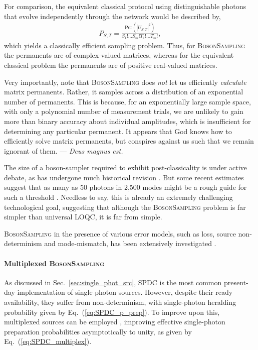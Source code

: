 For comparison, the equivalent classical protocol using distinguishable photons that evolve independently through the network would be described by,
\begin{align}
	P_{S,T} = \frac{\mathrm{Per}(|U_{S,T}|^2)}{S_1!\dots S_m! T_1!\dots T_m!},
\end{align}
which yields a classically efficient sampling problem. Thus, for \textsc{BosonSampling} the permanents are of complex-valued matrices, whereas for the equivalent classical problem the permanents are of positive real-valued matrices.

Very importantly, note that \textsc{BosonSampling} does \textit{not} let us efficiently \textit{calculate} matrix permanents. Rather, it samples across a distribution of an exponential number of permanents. This is because, for an exponentially large sample space, with only a polynomial number of measurement trials, we are unlikely to gain more than binary accuracy about individual amplitudes, which is insufficient for determining any particular permanent. It appears that God knows how to efficiently solve matrix permanents, but conspires against us such that we remain ignorant of them. --- \textit{Deus magnus est.}

The size of a boson-sampler required to exhibit post-classicality is under active debate, as has undergone much historical revision \cite{RohdeRalph}. But some recent estimates suggest that as many as 50 photons in 2,500 modes might be a rough guide for such a threshold \cite{NoSupBS_Montanaro}. Needless to say, this is already an extremely challenging technological goal, suggesting that although the \textsc{BosonSampling} problem is far simpler than universal LOQC, it is far from simple.

\textsc{BosonSampling} in the presence of various error models, such as loss, source non-determinism and mode-mismatch, has been extensively investigated \cite{bib:RohdeErrBS12, bib:RohdeSPDC13, bib:ScottLost16, bib:RohdeArbSpec15, bib:RandBS}. 

%
%

\paragraph{Multiplexed \textsc{BosonSampling}} 

As discussed in Sec.~\ref{sec:single_phot_src}, SPDC is the most common present-day implementation of single-photon sources. However, despite their ready availability, they suffer from non-determinism, with single-photon heralding probability given by Eq.~(\ref{eq:SPDC_p_prep}). To improve upon this, multiplexed sources can be employed \cite{bib:RohdeSPDC13}, improving effective single-photon preparation probabilities asymptotically to unity, as given by Eq.~(\ref{eq:SPDC_multiplex}).


